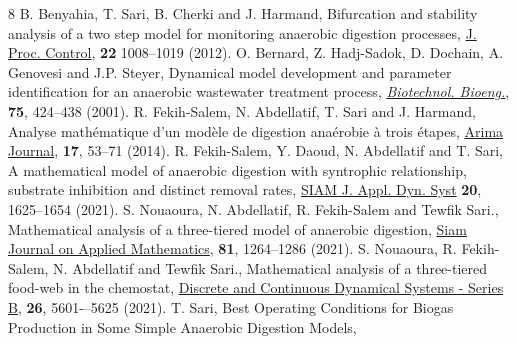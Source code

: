 \documentclass[runningheads]{llncs}
\begin{document}
\begin{thebibliography}{8}
\newblock B. Benyahia, T. Sari, B. Cherki and J. Harmand,
\newblock Bifurcation and stability analysis of a two step model for monitoring anaerobic digestion processes,
\newblock \href{https://doi.org/10.1016/j.jprocont.2012.04.012}{J. Proc. Control}, \textbf{22} 1008--1019 (2012). \vspace*{2pt}
\newblock O. Bernard, Z. Hadj-Sadok, D. Dochain, A. Genovesi and J.P. Steyer,
\newblock Dynamical model development and parameter identification for an anaerobic wastewater treatment process,
\newblock \href{https://doi.org/10.1002/bit.10036}{\emph{Biotechnol. Bioeng.}}, \textbf{75}, 424--438 (2001).\vspace*{2pt}
\newblock R. Fekih-Salem, N. Abdellatif, T. Sari and J. Harmand,
\newblock Analyse mathématique d'un modèle de digestion anaérobie à trois étapes,
\newblock \href{https://doi.org/10.46298/arima.1967}{Arima Journal}, \textbf{17}, 53--71 (2014).\vspace*{2pt}
\newblock R. Fekih-Salem, Y. Daoud, N. Abdellatif and T. Sari,
\newblock A mathematical model of anaerobic digestion with syntrophic relationship, substrate inhibition and distinct removal rates,
\newblock \href{https://doi.org/10.1137/20M1376480}{SIAM J. Appl. Dyn. Syst} \textbf{20}, 1625--1654 (2021).\vspace*{2pt}
\newblock S. Nouaoura, N. Abdellatif, R. Fekih-Salem and Tewfik Sari.,
\newblock Mathematical analysis of a three-tiered model of anaerobic digestion,
\newblock \href{https://doi.org/10.46298/arima.1967}{Siam Journal on Applied Mathematics}, \textbf{81}, 1264--1286 (2021).\vspace*{2pt}
\newblock S. Nouaoura, R. Fekih-Salem, N. Abdellatif and Tewfik Sari.,
\newblock Mathematical analysis of a three-tiered food-web in the chemostat,
\newblock \href{https://doi.org/10.46298/arima.1967}{Discrete and Continuous Dynamical Systems - Series B}, \textbf{26}, 5601-–5625 (2021).\vspace*{2pt}
\newblock T. Sari,
\newblock Best Operating Conditions for Biogas Production in Some Simple Anaerobic Digestion Models,

\end{thebibliography}
\end{document}
